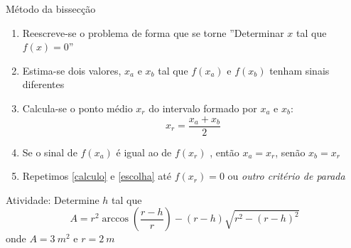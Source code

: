 \begin{frame}{Método da bissecção}
    \begin{enumerate}
        \item Reescreve-se o problema de forma que se torne ''Determinar \(x\) tal que \(f(x)=0\)''
        \item Estima-se dois valores, $x_a$ e $x_b$ tal que $f(x_a)$ e $f(x_b)$ tenham sinais diferentes
        \item \label{calculo} Calcula-se o ponto médio \(x_r\) do intervalo formado por $x_a$ e $x_b$:
            \[
                x_r=\frac{x_a + x_b}{2}
            \]
        \item \label{escolha} Se o sinal de $f(x_a)$ é igual ao de $f(x_r)$ , então $x_a = x_r$, senão $x_b=x_r$
        \item Repetimos \ref{calculo} e \ref{escolha} até $f(x_r)=0$ ou \textit{outro critério de parada}
    \end{enumerate}

    \pause
    \begin{tcolorbox}[colback=red!10]
        Atividade: Determine \(h\) tal que
        \[
            A=r^2 \arccos{\left(\frac{r-h}{r}\right)}-(r-h)\sqrt{r^2-(r-h)^2}
        \]
        onde \(A=\SI{3}{m^2}\) e \(r=\SI{2}{m}\)
    \end{tcolorbox}
\end{frame}

